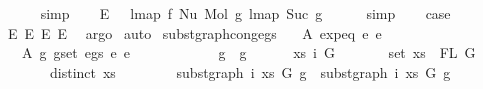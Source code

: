 \begin{isabellebody}
\ \ \ \ \isamarkupfalse%
\ simp\isanewline
\ \ \isamarkupfalse%
\ E{}{\isacharcolon}{\kern0pt}\ {\isachardoublequoteopen}{\isachardot}{\kern0pt}{\isachardot}{\kern0pt}{\isachardot}{\kern0pt}\ {\isacharequal}{\kern0pt}\ lmap\ f\ {\isacharparenleft}{\kern0pt}Nu\ {\isacharparenleft}{\kern0pt}Mol\ g{}\ {\isacharparenleft}{\kern0pt}lmap\ Suc\ g{}{\isacharparenright}{\kern0pt}{\isacharparenright}{\kern0pt}{\isacharparenright}{\kern0pt}{\isachardoublequoteclose}\isanewline
\ \ \ \ \isamarkupfalse%
\ simp\isanewline
\isanewline
\ \ \isamarkupfalse%
\ {\isacharquery}{\kern0pt}case\isanewline
\ \ \ \ \isamarkupfalse%
\ E{}\ E{}\ E{}\ E{}\ \isamarkupfalse%
\ argo\isanewline
{}\isamarkupfalse%
\ auto%
\endisatagproof
{\isafoldproof}%
%
\isadelimproof
%
\endisadelimproof
%
\isadelimdocument
%
\endisadelimdocument
%
\isatagdocument
%
\isamarkuptrue%
%
\endisatagdocument
{\isafolddocument}%
%
\isadelimdocument
%
\endisadelimdocument
{}\isamarkupfalse%
\ subst{\isacharunderscore}{\kern0pt}graph{\isacharunderscore}{\kern0pt}cong{\isacharunderscore}{\kern0pt}egs{\isacharcolon}{\kern0pt}\isanewline
\ \ \ A{}{\isacharcolon}{\kern0pt}\ {\isachardoublequoteopen}expeq\ e{}\ e{}{\isachardoublequoteclose}\isanewline
\ \ \ A{}{\isacharcolon}{\kern0pt}\ {\isachardoublequoteopen}{\isasymforall}{\isacharparenleft}{\kern0pt}g{}{\isacharcomma}{\kern0pt}\ g{}{\isacharparenright}{\kern0pt}{\isasymin}set\ {\isacharparenleft}{\kern0pt}egs\ e{}\ e{}{\isacharparenright}{\kern0pt}{\isachardot}{\kern0pt}\isanewline
\ \ \ \ \ \ \ \ \ \ \ \ g{}\ {\isasymsimeq}\ g{}\ {\isasymand}\isanewline
\ \ \ \ \ {\isacharparenleft}{\kern0pt}{\isasymforall}xs\ i\ G{\isachardot}{\kern0pt}\isanewline
\ \ \ \ \ \ \ set\ xs\ {\isacharequal}{\kern0pt}\ FL\ G\ {\isacharminus}{\kern0pt}{\isacharminus}{\kern0pt}{\isachargreater}{\kern0pt}\isanewline
\ \ \ \ \ \ \ distinct\ xs\ {\isacharminus}{\kern0pt}{\isacharminus}{\kern0pt}{\isachargreater}{\kern0pt}\isanewline
\ \ \ \ \ \ \ subst{\isacharunderscore}{\kern0pt}graph\ i\ xs\ G\ g{}\ {\isasymsimeq}\ subst{\isacharunderscore}{\kern0pt}graph\ i\ xs\ G\ g{}{\isacharparenright}{\kern0pt}{\isachardoublequoteclose}\isanewline

\end{isabellebody}
